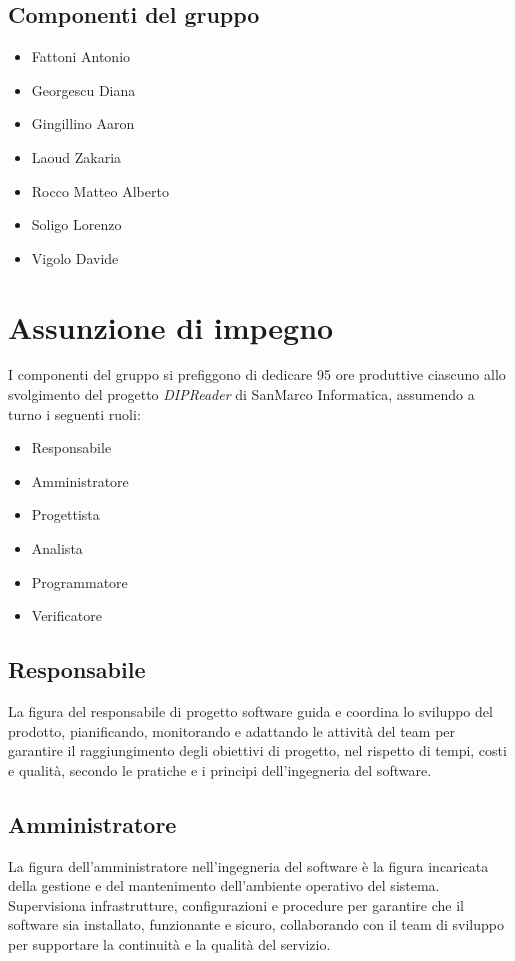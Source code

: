 \documentclass[a4paper,12pt]{article}
\begin{document}
\subsection*{Componenti del gruppo}
\begin{itemize}[noitemsep]
    \item Fattoni Antonio 
    \item Georgescu Diana
    \item Gingillino Aaron
    \item Laoud Zakaria
    \item Rocco Matteo Alberto
    \item Soligo Lorenzo
    \item Vigolo Davide
\end{itemize}

\vspace{0.5cm}
\section{Assunzione di impegno}
I componenti del gruppo si prefiggono di dedicare 95 ore produttive ciascuno allo svolgimento del progetto \textit{DIPReader} di SanMarco Informatica, assumendo a turno i seguenti ruoli:
\begin{itemize} [noitemsep]
    \item Responsabile
    \item Amministratore
    \item Progettista
    \item Analista
    \item Programmatore
    \item Verificatore
\end{itemize}

\subsection*{Responsabile}
La figura del responsabile di progetto software guida e coordina lo sviluppo del prodotto, pianificando, monitorando e adattando le attività del team per garantire il raggiungimento degli obiettivi di progetto, nel rispetto di tempi, costi e qualità, secondo le pratiche e i principi dell'ingegneria del software.

\subsection*{Amministratore}
La figura dell'amministratore nell'ingegneria del software è la figura incaricata della gestione e del mantenimento dell'ambiente operativo del sistema. Supervisiona infrastrutture, configurazioni e procedure per garantire che il software sia installato, funzionante e sicuro, collaborando con il team di sviluppo per supportare la continuità e la qualità del servizio.
\end{document}
